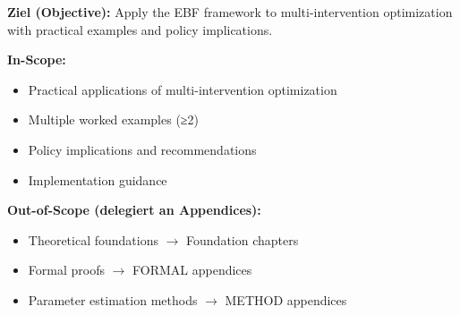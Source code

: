 \begin{tcolorbox}[
    colback=purple!5!white,
    colframe=purple!75!black,
    title={\textbf{Chapter Scope: Ziel / In-Scope / Out-of-Scope}},
    fonttitle=\bfseries
]

\textbf{Ziel (Objective):}
Apply the EBF framework to multi-intervention optimization with practical examples and policy implications.

\vspace{0.3cm}
\textbf{In-Scope:}
\begin{itemize}[nosep]
    \item Practical applications of multi-intervention optimization
    \item Multiple worked examples (≥2)
    \item Policy implications and recommendations
    \item Implementation guidance
\end{itemize}

\vspace{0.3cm}
\textbf{Out-of-Scope (delegiert an Appendices):}
\begin{itemize}[nosep]
    \item Theoretical foundations $\rightarrow$ Foundation chapters
    \item Formal proofs $\rightarrow$ FORMAL appendices
    \item Parameter estimation methods $\rightarrow$ METHOD appendices
\end{itemize}

\end{tcolorbox}



